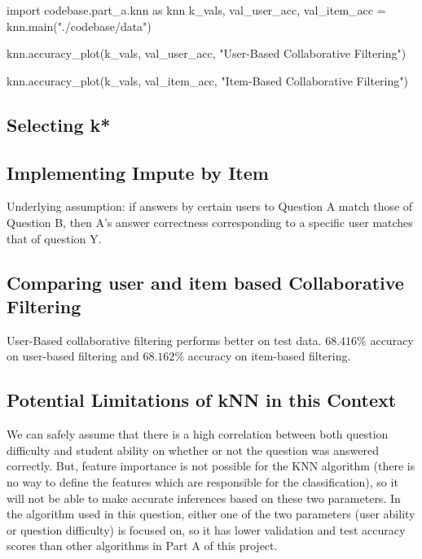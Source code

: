 \documentclass{article}
\begin{document}
    \begin{pylabblock}
        import codebase.part_a.knn as knn
        k_vals, val_user_acc, val_item_acc = knn.main("./codebase/data")
    \end{pylabblock}

    \begin{pylabblock}
        knn.accuracy_plot(k_vals, val_user_acc, "User-Based Collaborative Filtering")
    \end{pylabblock}

    \begin{pylabblock}
        knn.accuracy_plot(k_vals, val_item_acc, "Item-Based Collaborative Filtering")
    \end{pylabblock}

    


    \subsection{Selecting k*}
    
    \subsection{Implementing Impute by Item}
    Underlying assumption: if answers by certain users to Question A match those of Question B, then A’s answer correctness corresponding to a specific user matches that of question Y. 

    \subsection{Comparing user and item based Collaborative Filtering}
    User-Based collaborative filtering performs better on test data. $68.416\%$ accuracy on user-based filtering and $68.162\%$ accuracy on item-based filtering.

    \subsection{Potential Limitations of kNN in this Context}
    We can safely assume that there is a high correlation between both question difficulty and student ability on whether or not the question was answered correctly. But, feature importance is not possible for the KNN algorithm (there is no way to define the features which are responsible for the classification), so it will not be able to make accurate inferences based on these two parameters. In the algorithm used in this question, either one of the two parameters (user ability or question difficulty) is focused on, so it has lower validation and test accuracy scores than other algorithms in Part A of this project. 
\end{document}
